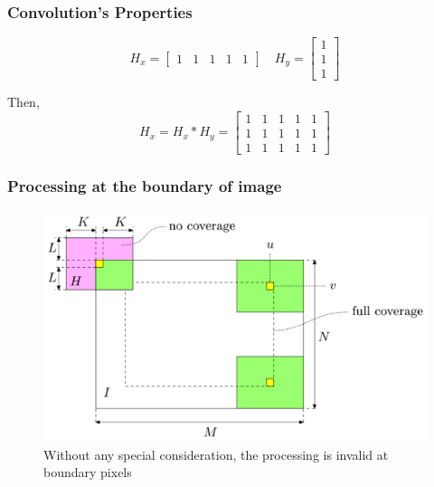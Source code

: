 \documentclass[english,11pt,table,handout]{beamer}
\begin{document}
\frame
{
	\frametitle{Convolution's Properties}
	\begin{example}
		$$
		H_{x} = 
		\begin{bmatrix}
		1 & 1 & 1 & 1 & 1
		\end{bmatrix}
		\quad
		H_{y} = 
		\begin{bmatrix}
		1 \\ 1 \\ 1
		\end{bmatrix}
		$$
		
		Then,
		$$
		H_{x}  = H_{x} * H_{y} = 
		\begin{bmatrix}
			1 & 1 & 1 & 1 & 1\\
			1 & 1 & 1 & 1 & 1\\
			1 & 1 & 1 & 1 & 1
		\end{bmatrix}
		$$
		
	\end{example}
	
}
\frame
{
	\frametitle{Processing at the boundary of image}
	
	\begin{figure}[!h]
		\includegraphics[scale=0.57]{boundary_effect.png}
		\caption{Without any special consideration, the processing is invalid at boundary pixels} 
	\end{figure}

}
\frame
\end{document}
